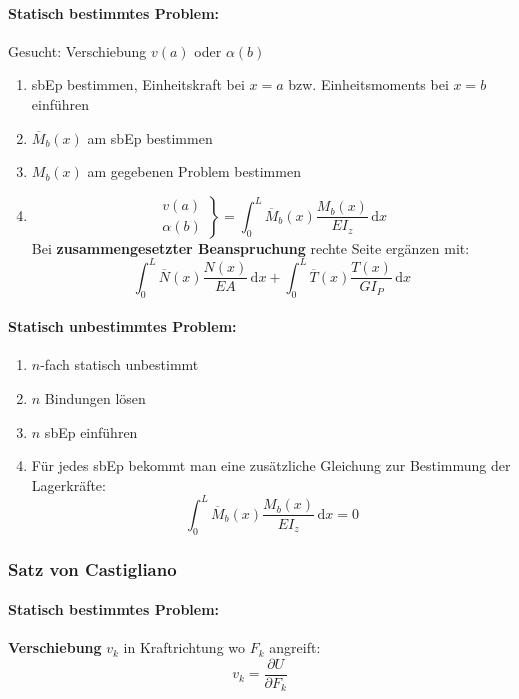 \documentclass{article}
\newcommand{\ud}{\,\mathrm{d}}
\begin{document}
\begin{multicols*}{4}
					\paragraph{Statisch bestimmtes Problem:} %
						Gesucht: Verschiebung $v(a)$ oder $\alpha(b)$
						\begin{enumerate}
							\item sbEp bestimmen, Einheitskraft bei $x=a$
							bzw. Einheitsmoments bei $x=b$ einführen
							\item $\overline{M}_b(x)$ am sbEp bestimmen
							\item $M_b(x)$ am gegebenen Problem bestimmen
							\item \[
								\left.
								\begin{array}{r}
								v(a) \\
								\alpha(b)
								\end{array}
								\right\}
								 = \int_0^L \overline{M}_b(x) \frac{M_b(x)}{EI_z} \ud x
							\]
							Bei \textbf{zusammengesetzter Beanspruchung} rechte Seite ergänzen mit:
							\[
								\int_0^L \overline{N}(x) \frac{N(x)}{EA} \ud x + \int_0^L \overline{T}(x) \frac{T(x)}{GI_P} \ud x
							\]
						\end{enumerate}
					\paragraph{Statisch unbestimmtes Problem:} %
						\begin{enumerate}
							\item $n$-fach statisch unbestimmt
							\item $n$ Bindungen lösen
							\item $n$ sbEp einführen
							\item Für jedes sbEp bekommt man eine zusätzliche Gleichung zur Bestimmung der Lagerkräfte:
							\[
								\int_0^L \overline{M}_b(x) \frac{M_b(x)}{EI_z} \ud x = 0
							\]
						\end{enumerate}
				\subsubsection{Satz von Castigliano} %
					\paragraph{Statisch bestimmtes Problem:} %
						\textbf{Verschiebung} $v_k$ in Kraftrichtung wo $F_k$ angreift:
						\[
							v_k = \frac{\partial U}{\partial F_k}
						\]
						

\end{multicols*}
\end{document}
